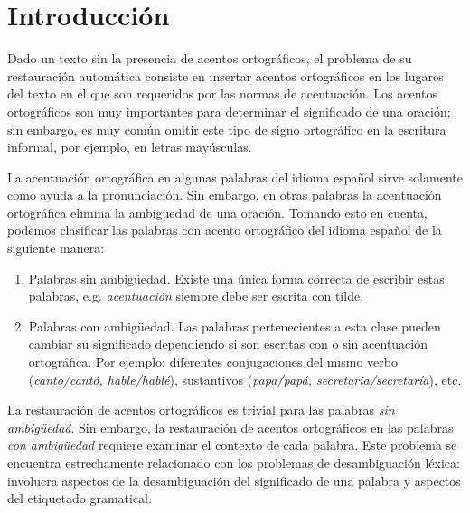 \documentclass[runningheads,a4paper]{llncs}
\begin{document}
\section{Introducción}
Dado un texto sin la presencia de acentos ortográficos, el problema de su  restauración automática consiste en insertar acentos ortográficos en los lugares del texto en el que son requeridos por las normas de acentuación. Los acentos ortográficos son muy importantes para determinar el significado de una oración; sin embargo, es muy común omitir este tipo de signo ortográfico en la escritura informal, por ejemplo, en letras mayúsculas.

La acentuación ortográfica en algunas palabras del idioma español sirve solamente como ayuda a la pronunciación. Sin embargo, en otras palabras la acentuación ortográfica elimina la ambigüedad de una oración. Tomando esto en cuenta, podemos clasificar las palabras con acento ortográfico del idioma español de la siguiente manera\cite{CRANDALL95}:
\begin{enumerate}
\item{Palabras sin ambigüedad}. Existe una única forma correcta de escribir estas palabras, e.g. \emph{acentuación} siempre debe ser escrita con tilde.
\item{Palabras con ambigüedad}. Las palabras pertenecientes a esta clase pueden cambiar su significado dependiendo si son escritas con o sin acentuación ortográfica. Por ejemplo: diferentes conjugaciones del mismo verbo (\emph{canto/cantó, hable/hablé}), sustantivos (\emph{papa/papá, secretaria/secretaría}), etc.
\end{enumerate}

La restauración de acentos ortográficos es trivial para las palabras \emph{sin ambig\"uedad}. Sin embargo, la restauración de acentos ortográficos en las palabras \emph{con ambig\"uedad} requiere examinar el contexto de cada palabra. Este problema se encuentra estrechamente relacionado con los problemas de desambiguación léxica: involucra aspectos de la desambiguación del significado de una palabra y aspectos del etiquetado gramatical. 
\end{document}
